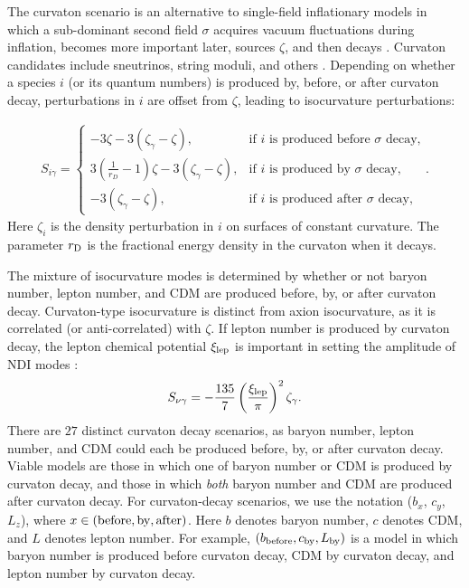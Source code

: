The curvaton scenario is an alternative to single-field inflationary models in which a sub-dominant second field $\sigma$ acquires vacuum fluctuations during inflation, becomes more important later, sources $\zeta$, and then decays \cite{Mollerach:1989hu,Mukhanov:1990me,Moroi:2001ct,Lyth:2001nq,Lyth:2002my}. Curvaton candidates include sneutrinos, string moduli, and others \cite{Postma:2002et,Kasuya:2003va,Ikegami:2004ve,Mazumdar:2004qv,Allahverdi:2006dr,Papantonopoulos:2006xi,Mazumdar:2010sa,Mazumdar:2011xe}. Depending on whether a species $i$ (or its quantum numbers) is produced by, before, or after curvaton decay, perturbations in $i$ are offset from $\zeta$, leading to isocurvature perturbations: \cite{Lyth:2001nq,Lyth:2002my,Gordon:2002gv}

\begin{eqnarray}
S_{i \gamma}=\left\{\begin{array}{ll}-3\zeta-3(\zeta_{\gamma}-\zeta),&\mbox{if $i$ is produced before $\sigma$ decay,}\\3\left(\frac{1}{r_{D}}-1\right)\zeta-3(\zeta_{\gamma}-\zeta),&\mbox{if $i$ is produced by $\sigma$ decay},\\ -3(\zeta_\gamma-\zeta),&\mbox{if $i$ is produced after $\sigma$ decay},\end{array}\right.\label{eq:strew}.
\end{eqnarray} Here $\zeta_{i}$ is the density perturbation in $i$ on surfaces of constant curvature. The parameter $r_{\rm D}$ is the fractional energy density in the curvaton when it decays. 

The mixture of isocurvature modes is determined by whether or not baryon number, lepton number, and CDM are produced before, by, or after curvaton decay. Curvaton-type isocurvature is distinct from axion isocurvature, as it is correlated (or anti-correlated) with $\zeta$. If lepton number is produced by curvaton decay, the lepton chemical potential $\xi_{\rm lep}$ is important in setting the amplitude of NDI modes \cite{Lyth:2002my,Gordon:2003hw,DiValentino:2011sv}:
\begin{equation}
S_{\nu \gamma}=
-\frac{135}{7}\left(\frac{\xi_{\rm lep}}{\pi}\right)^2\zeta_{\gamma}.\end{equation}
There are $27$ distinct curvaton decay scenarios, as baryon number, lepton number, and CDM could each be produced before, by, or after curvaton decay. Viable models are those in which one of baryon number or CDM is produced by curvaton decay, and those in which \textit{both} baryon number and CDM are produced after curvaton decay. For curvaton-decay scenarios, we use the notation ($b_{x}$, $c_{y}$, $L_{z}$), where $x\in ({\rm before, by, after})$. Here $b$ denotes baryon number, $c$ denotes CDM, and $L$ denotes lepton number. For example, $(b_{\rm before}, c_{\rm by}, L_{\rm by})$ is a model in which baryon number is produced before curvaton decay, CDM by curvaton decay, and lepton number by curvaton decay.

